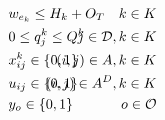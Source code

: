 \documentclass{article}
\begin{document}
\begin{alignat}{3}
    \label{mod:c31}        & w_{e_k} \leq H_k + O_T                                                                                                                                                                                                                                                                           & \hspace{-00mm}  k \in K \hspace{0mm}                                                             \\
    \label{mod:c32}        & 0 \leq q^k_j \leq Q^k                                                                                                                                                                                                                                                                            & \hspace{-20mm}  j \in \mathcal{D}, k \in K                                                       \\
    \label{mod:c33}        & x^k_{ij} \in \{0,1\}                                                                                                                                                                                                                                                                             & \hspace{-20mm}  (i,j) \in A , k \in K  \hspace{0mm}                                              \\
    \label{mod:c34}        & u_{ij} \in \{0,1\}                                                                                                                                                                                                                                                                               & \hspace{-20mm}  (i,j) \in A^D , k \in K  \hspace{0mm}                                            \\
    \label{mod:c36}        & y_o \in \{0,1\}                                                                                                                                                                                                                                                                                  & \hspace{-20mm}  o \in \mathcal{O}                                                                \\

\end{alignat}
\end{document}
